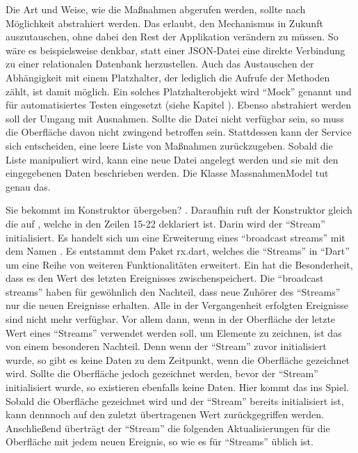 Die Art und Weise, wie die Maßnahmen abgerufen werden, sollte nach Möglichkeit abstrahiert werden.
Das erlaubt, den Mechanismus in Zukunft auszutauschen, ohne dabei den Rest der Applikation verändern zu müssen.
So wäre es beispielsweise denkbar, statt einer JSON-Datei eine direkte Verbindung zu einer relationalen Datenbank herzustellen.
Auch das Austauschen der Abhängigkeit mit einem Platzhalter, der lediglich die Aufrufe der Methoden zählt, ist damit möglich.
Ein solches Platzhalterobjekt wird \enquote{Mock} genannt und für automatisiertes Testen eingesetzt (siehe Kapitel  ).
Ebenso abstrahiert werden soll der Umgang mit Ausnahmen.
Sollte die Datei nicht verfügbar sein, so muss die Oberfläche davon nicht zwingend betroffen sein.
Stattdessen kann der Service sich entscheiden, eine leere Liste von Maßnahmen zurückzugeben.
Sobald die Liste manipuliert wird, kann eine neue Datei angelegt werden und sie mit den eingegebenen Daten beschrieben werden.
Die Klasse MassnahmenModel \Lst{\ref{lst:Schritt1KlasseMassnahmenModel}} tut genau das.






Sie bekommt  im Konstruktor übergeben? .
Daraufhin ruft der Konstruktor gleich die  auf , welche in den Zeilen 15-22 deklariert ist.
Darin wird der \enquote{Stream}   initialisiert.
Es handelt sich um eine Erweiterung eines \enquote{broadcast streams} mit dem Namen  .
Es entstammt dem Paket rx.dart, welches die \enquote{Streams} in \enquote{Dart} um eine Reihe von weiteren Funktionalitäten erweitert. Ein  hat die Besonderheit, dass es den Wert des letzten Ereignisses zwischenspeichert. Die \enquote{broadcast streams} haben für gewöhnlich den Nachteil, dass neue Zuhörer des \enquote{Streams} nur die neuen Ereignisse erhalten. Alle in der Vergangenheit erfolgten Ereignisse sind nicht mehr verfügbar. Vor allem dann, wenn in der Oberfläche der letzte Wert eines \enquote{Streams} verwendet werden soll, um Elemente zu zeichnen, ist das von einem besonderen Nachteil. Denn wenn der \enquote{Stream} zuvor initialisiert wurde, so gibt es keine Daten zu dem Zeitpunkt, wenn die Oberfläche gezeichnet wird. Sollte die Oberfläche jedoch gezeichnet werden, bevor der \enquote{Stream} initialisiert wurde, so  existieren ebenfalls keine Daten. Hier kommt das  ins Spiel. Sobald die Oberfläche gezeichnet wird und der \enquote{Stream} bereits initialisiert ist, kann dennnoch auf den zuletzt übertragenen Wert zurückgegriffen werden. Anschließend überträgt der \enquote{Stream} die folgenden Aktualisierungen für die Oberfläche mit jedem neuen Ereignis, so wie es für \enquote{Streams} üblich ist.

